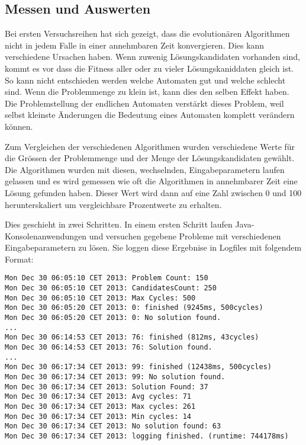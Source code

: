\subsection{Messen und Auswerten}
Bei ersten Versuchsreihen hat sich gezeigt, dass die evolutionären Algorithmen nicht in jedem Falle in einer annehmbaren Zeit konvergieren. Dies kann verschiedene Ursachen haben. Wenn zuwenig Lösungskandidaten vorhanden sind, kommt es vor dass die Fitness aller oder zu vieler Lösungskaniddaten gleich ist. So kann nicht entschieden werden welche Automaten gut und welche schlecht sind. Wenn die Problemmenge zu klein ist, kann dies den selben Effekt haben. Die Problemstellung der endlichen Automaten verstärkt dieses Problem, weil selbst kleinste Änderungen die Bedeutung eines Automaten komplett verändern können.

Zum Vergleichen der verschiedenen Algorithmen wurden verschiedene Werte für die Grössen der Problemmenge und der Menge der Lösungskandidaten gewählt. Die Algorithmen wurden mit diesen, wechselnden, Eingabeparametern laufen gelassen und es wird gemessen wie oft die Algorithmen in annehmbarer Zeit eine Lösung gefunden haben. Dieser Wert wird dann auf eine Zahl zwischen 0 und 100 herunterskaliert um vergleichbare Prozentwerte zu erhalten.

Dies geschieht in zwei Schritten. In einem ersten Schritt laufen Java-Konsolenanwendungen und versuchen gegebene Probleme mit verschiedenen Eingabeparametern zu lösen. Sie loggen diese Ergebnise in Logfiles mit folgendem Format:

\begin{lstlisting}[caption={Log Format}, label={lst:log_format}]
Mon Dec 30 06:05:10 CET 2013: Problem Count: 150
Mon Dec 30 06:05:10 CET 2013: CandidatesCount: 250
Mon Dec 30 06:05:10 CET 2013: Max Cycles: 500
Mon Dec 30 06:05:20 CET 2013: 0: finished (9245ms, 500cycles)
Mon Dec 30 06:05:20 CET 2013: 0: No solution found.
...
Mon Dec 30 06:14:53 CET 2013: 76: finished (812ms, 43cycles)
Mon Dec 30 06:14:53 CET 2013: 76: Solution found.
...
Mon Dec 30 06:17:34 CET 2013: 99: finished (12438ms, 500cycles)
Mon Dec 30 06:17:34 CET 2013: 99: No solution found.
Mon Dec 30 06:17:34 CET 2013: Solution Found: 37
Mon Dec 30 06:17:34 CET 2013: Avg cycles: 71
Mon Dec 30 06:17:34 CET 2013: Max cycles: 261
Mon Dec 30 06:17:34 CET 2013: Min cycles: 14
Mon Dec 30 06:17:34 CET 2013: No solution found: 63
Mon Dec 30 06:17:34 CET 2013: logging finished. (runtime: 744178ms)
\end{lstlisting}

